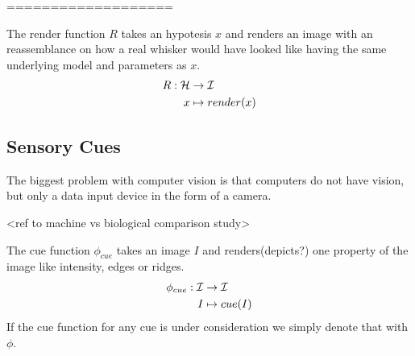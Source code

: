 %
%

%
%

%
%






===================

\begin{definition}
    The render function $R$ takes an hypotesis $x$ and renders an image with an
    reassemblance on how a real whisker would have looked like having the same
    underlying model and parameters as $x$.
    \begin{equation}
        \begin{split}
            R : \mathcal{H} &\rightarrow \mathcal{I}\\
                x &\mapsto render(x)
        \end{split}
    \end{equation}
\end{definition}


\subsection{Sensory Cues}

The biggest problem with computer vision is that computers do not have
vision, but only a data input device in the form of a camera. 

<ref to machine vs biological comparison study>


\begin{definition}
    The cue function $\phi_{cue}$ takes an image $I$ and renders(depicts?) one property of the
    image like intensity, edges or ridges.
    \begin{equation}
        \begin{split}
            \phi_{cue} : \mathcal{I} &\rightarrow \mathcal{I}\\
                I &\mapsto cue(I)
        \end{split}
    \end{equation}
    If the cue function for any cue is under consideration we simply denote that with $\phi$.
\end{definition}


